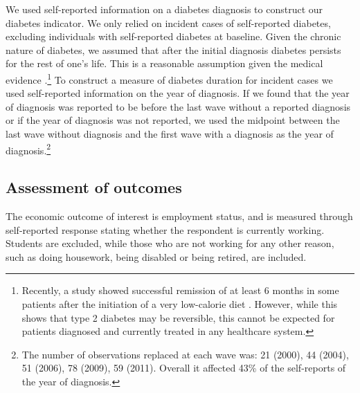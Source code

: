We used self-reported information on a diabetes diagnosis to construct our diabetes indicator. We only relied on incident cases of self-reported diabetes, excluding individuals with self-reported diabetes at baseline. Given the chronic nature of diabetes, we assumed that after the initial diagnosis diabetes persists for the rest of one's life. This is a reasonable assumption given the medical evidence \parencite{Steven2016}.\footnote{Recently, a study showed successful remission of at least 6 months in some patients after the initiation of a very low-calorie diet \parencite{Steven2016}. However, while this shows that type 2 diabetes may be reversible, this cannot be expected for patients diagnosed and currently treated in any healthcare system.} To construct a measure of diabetes duration for incident cases we used self-reported information on the year of diagnosis. If we found that the year of diagnosis was reported to be before the last wave without a reported diagnosis or if the year of diagnosis was not reported, we used the midpoint between the last wave without diagnosis and the first wave with a diagnosis as the year of diagnosis.\footnote{The number of observations replaced at each wave was: 21 (2000), 44 (2004), 51  (2006), 78 (2009), 59 (2011). Overall it affected 43\% of the self-reports of the year of diagnosis.}

\subsection{Assessment of outcomes}

The economic outcome of interest is employment status, and is measured through self-reported response stating whether the respondent is currently working. Students are excluded, while those who are not working for any other reason, such as doing housework, being disabled or being retired, are included. 

